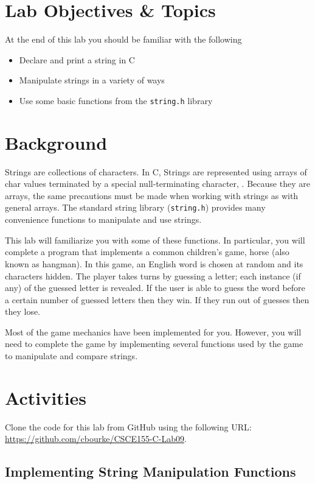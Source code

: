 \documentclass[12pt]{scrartcl}
\begin{document}
\section{Lab Objectives \& Topics}
At the end of this lab you should be familiar with the following
\begin{itemize}
  \item Declare and print a string in C
  \item Manipulate strings in a variety of ways
  \item Use some basic functions from the \texttt{string.h} library
\end{itemize}

\section{Background}

Strings are collections of characters.  In C, Strings are represented using 
arrays of char values terminated by a special null-terminating character, 
\texttt{\0}.  Because they are arrays, the same precautions must 
be made when working with strings as with general arrays.  The standard 
string library (\texttt{string.h}) provides many convenience 
functions to manipulate and use strings.

This lab will familiarize you with some of these functions.  In particular, 
you will complete a program that implements a common children's game, 
horse (also known as hangman).  In this game, an English word is chosen 
at random and its characters hidden.  The player takes turns by guessing 
a letter; each instance (if any) of the guessed letter is revealed.  If the 
user is able to guess the word before a certain number of guessed letters 
then they win.  If they run out of guesses then they lose.

Most of the game mechanics have been implemented for you.  However, 
you will need to complete the game by implementing several functions 
used by the game to manipulate and compare strings.

\section{Activities}

Clone the code for this lab from GitHub using the following URL: 
\url{https://github.com/cbourke/CSCE155-C-Lab09}.

\subsection{Implementing String Manipulation Functions}
\end{document}
